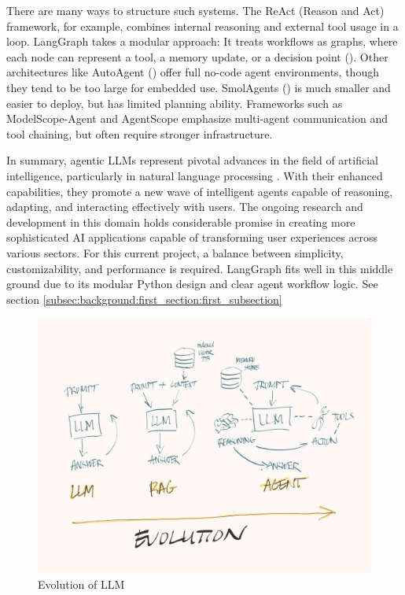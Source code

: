 There are many ways to structure such systems. The ReAct (Reason and Act) framework, for example, combines internal reasoning and external tool usage in a loop. LangGraph takes a modular approach: It treats workflows as graphs, where each node can represent a tool, a memory update, or a decision point (\cite{langchain_agent_2024}). Other architectures like AutoAgent (\cite{tang_autoagent_2025}) offer full no-code agent environments, though they tend to be too large for embedded use. SmolAgents (\cite{kumari_smolagents_2025}) is much smaller and easier to deploy, but has limited planning ability. Frameworks such as ModelScope-Agent and AgentScope emphasize multi-agent communication and tool chaining, but often require stronger infrastructure.

In summary, agentic LLMs represent pivotal advances in the field of artificial intelligence, particularly in natural language processing \cite{matthew_berman_ai_2024, ibm_technology_ai_2024, don_woodlock_using_2025}. With their enhanced capabilities, they promote a new wave of intelligent agents capable of reasoning, adapting, and interacting effectively with users. The ongoing research and development in this domain holds considerable promise in creating more sophisticated AI applications capable of transforming user experiences across various sectors. For this current project, a balance between simplicity, customizability, and performance is required. LangGraph fits well in this middle ground due to its modular Python design and clear agent workflow logic. See section \autoref{subsec:background:first_section:first_subsection} 

\begin{figure}[H]
    \centering
    \includegraphics[width=\textwidth]{docs/llm_evolution.jpg}
    \caption{Evolution of LLM}
\end{figure}



